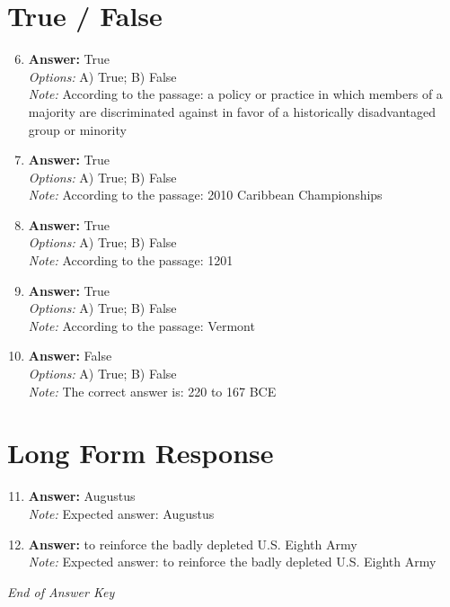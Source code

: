 \documentclass[12pt]{article}
\begin{document}
\section*{True / False}
\begin{enumerate}[label=\arabic*.]
\setcounter{enumi}{5}
\item \textbf{Answer:} True
\\ \textit{Options:} A) True; B) False
\\ \textit{Note:} According to the passage: a policy or practice in which members of a majority are discriminated against in favor of a historically disadvantaged group or minority
\item \textbf{Answer:} True
\\ \textit{Options:} A) True; B) False
\\ \textit{Note:} According to the passage: 2010 Caribbean Championships
\item \textbf{Answer:} True
\\ \textit{Options:} A) True; B) False
\\ \textit{Note:} According to the passage: 1201
\item \textbf{Answer:} True
\\ \textit{Options:} A) True; B) False
\\ \textit{Note:} According to the passage: Vermont
\item \textbf{Answer:} False
\\ \textit{Options:} A) True; B) False
\\ \textit{Note:} The correct answer is: 220 to 167 BCE
\end{enumerate}

\section*{Long Form Response}
\begin{enumerate}[label=\arabic*.]
\setcounter{enumi}{10}
\item \textbf{Answer:} Augustus
\\ \textit{Note:} Expected answer: Augustus
\item \textbf{Answer:} to reinforce the badly depleted U.S. Eighth Army
\\ \textit{Note:} Expected answer: to reinforce the badly depleted U.S. Eighth Army
\end{enumerate}

\vfill
\noindent\textit{End of Answer Key}
\end{document}
